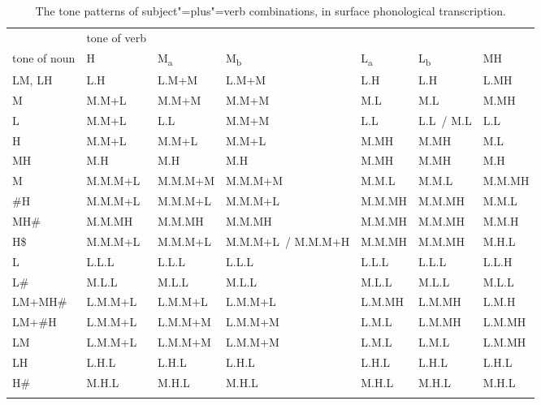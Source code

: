 \begin{table}
\caption{\label{tab:thetonepatternsofsubjectplusverbcombinationsinsurfacephonologicaltranscription}The tone patterns of subject"=plus"=verb combinations, in
  surface phonological transcription.}
\begin{tabularx}{\textheight}{ l@{\hspace{6mm}} Q l@{\hspace{6mm}} l@{\hspace{6mm}} l@{\hspace{6mm}} l@{\hspace{6mm}} Q }
\lsptoprule
& tone of verb & & & & &\\ 	
tone of noun & H & M\textsubscript{a} & M\textsubscript{b} & L\textsubscript{a} & L\textsubscript{b} & MH\\ \midrule
	LM, LH & L.H & L.M+M & L.M+M & L.H & L.H & L.MH\\
	M & M.M+L & M.M+M & M.M+M & M.L & M.L & M.MH\\
	L & M.M+L & L.L  & M.M+M & L.L & L.L~/ M.L & L.L\\
	H & M.M+L & M.M+L & M.M+L & M.MH & M.MH & M.L\\
	MH & M.H & M.H & M.H & M.MH & M.MH & M.H\\ \addlinespace \hdashline \addlinespace
	M & M.M.M+L & M.M.M+M & M.M.M+M & M.M.L & M.M.L & M.M.MH\\
	\#H & M.M.M+L & M.M.M+L & M.M.M+L & M.M.MH & M.M.MH & M.M.L\\
	MH\# & M.M.MH & M.M.MH & M.M.MH & M.M.MH & M.M.MH & M.M.H\\
	H\$ & M.M.M+L & M.M.M+L & M.M.M+L~/ M.M.M+H & M.M.MH & M.M.MH & M.H.L\\
	L & L.L.L & L.L.L & L.L.L & L.L.L & L.L.L & L.L.H\\
	L\# & M.L.L & M.L.L & M.L.L & M.L.L & M.L.L & M.L.L\\
	LM+MH\# & L.M.M+L & L.M.M+L & L.M.M+L & L.M.MH & L.M.MH & L.M.H\\
	LM+\#H & L.M.M+L & L.M.M+M & L.M.M+M & L.M.L & L.M.MH & L.M.MH\\
	LM & L.M.M+L & L.M.M+M & L.M.M+M & L.M.L & L.M.L & L.M.MH\\
	LH & L.H.L & L.H.L & L.H.L & L.H.L & L.H.L & L.H.L\\
	H\# & M.H.L & M.H.L & M.H.L & M.H.L & M.H.L & M.H.L\\
\lspbottomrule
\end{tabularx}
\end{table}


